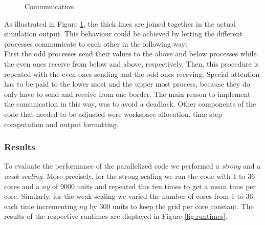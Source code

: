 \documentclass[12pt, a4paper, titlepage]{article}
\begin{document}
{\begin{figure}[h!]
\begin{minipage}{0.28\linewidth}
{
		}
		\caption{Communication}
		\label{fig:tikz}
		\end{minipage}
\end{figure}

As illustrated in Figure \ref{fig:tikz}, the thick lines are joined together in the actual simulation output. This behaviour could be achieved by letting the different processes communicate to each other in the following way:\\
First the odd processes send their values to the above and below processes while the even ones receive from below and above, respectively. Then, this procedure is repeated with the even ones sending and the odd ones receving. Special attention has to be paid to the lower most and the upper most process, because they do only have to send and receive from one border. The main reason to implement the comunication in this way, was to avoid a deadlock.
Other components of the code that needed to be adjusted were workspace allocation, time step computation and output formatting.




\subsubsection{Results}
To evaluate the performance of the parallelized code we performed a \textit{strong} and a \textit{weak scaling}. More precisely, for the strong scaling we ran the code with 1 to 36 cores and a $ny$ of 9000 units and repeated this ten times to get a mean time per core. Similarly, for the weak scaling we varied the number of cores from 1 to 36, each time incrementing $ny$ by 300 units to keep the grid per core constant. The results of the respective runtimes are displayed in Figure \ref{fig:runtimes}.

}
\end{document}

